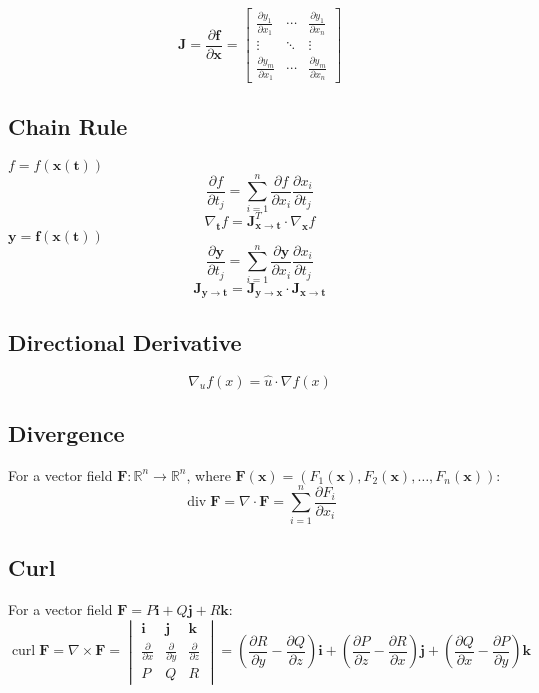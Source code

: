 \documentclass{article}
\begin{document}
\[
    \mathbf{J} = \frac{\partial \mathbf{f}}{\partial \mathbf{x}} =
    \begin{bmatrix}
        \frac{\partial y_1}{\partial x_1} & \cdots & \frac{\partial y_1}{\partial x_n} \\
        \vdots & \ddots & \vdots \\
        \frac{\partial y_m}{\partial x_1} & \cdots & \frac{\partial y_m}{\partial x_n}
    \end{bmatrix}
\]

\subsection{Chain Rule}

$f = f(\mathbf{x}(\mathbf{t}))$
\[
    \frac{\partial f}{\partial t_j} = \sum_{i=1}^n \frac{\partial f}{\partial x_i} \frac{\partial x_i}{\partial t_j}
\]
\[
    \nabla_{\mathbf{t}} f = \mathbf{J}_{\mathbf{x} \to \mathbf{t}}^T \cdot \nabla_{\mathbf{x}} f
\]
$\mathbf{y} = \mathbf{f}(\mathbf{x}(\mathbf{t}))$
\[
    \frac{\partial \mathbf{y}}{\partial t_j} = \sum_{i=1}^n \frac{\partial \mathbf{y}}{\partial x_i} \frac{\partial x_i}{\partial t_j}
\]
\[
    \mathbf{J}_{\mathbf{y} \to \mathbf{t}} = \mathbf{J}_{\mathbf{y} \to \mathbf{x}} \cdot \mathbf{J}_{\mathbf{x} \to \mathbf{t}}
\]

\subsection{Directional Derivative}

\[
    \nabla_u f(x) = \hat{u} \cdot \nabla f(x)
\]

\subsection{Divergence}
For a vector field $\mathbf{F}: \mathbb{R}^n \to \mathbb{R}^n$, where $\mathbf{F}(\mathbf{x}) = (F_1(\mathbf{x}), F_2(\mathbf{x}), \dots, F_n(\mathbf{x}))$:
\[
    \operatorname{div} \mathbf{F} = \nabla \cdot \mathbf{F} = \sum_{i=1}^n \frac{\partial F_i}{\partial x_i}
\]

\subsection{Curl}
For a vector field $\mathbf{F} = P\mathbf{i} + Q\mathbf{j} + R\mathbf{k}$:
\[
    \operatorname{curl} \mathbf{F} = \nabla \times \mathbf{F} =
    \begin{vmatrix}
        \mathbf{i} & \mathbf{j} & \mathbf{k} \\
        \frac{\partial}{\partial x} & \frac{\partial}{\partial y} & \frac{\partial}{\partial z} \\
        P & Q & R
    \end{vmatrix}
    = \left(\frac{\partial R}{\partial y} - \frac{\partial Q}{\partial z}\right)\mathbf{i} + \left(\frac{\partial P}{\partial z} - \frac{\partial R}{\partial x}\right)\mathbf{j} + \left(\frac{\partial Q}{\partial x} - \frac{\partial P}{\partial y}\right)\mathbf{k}
\]
\end{document}
